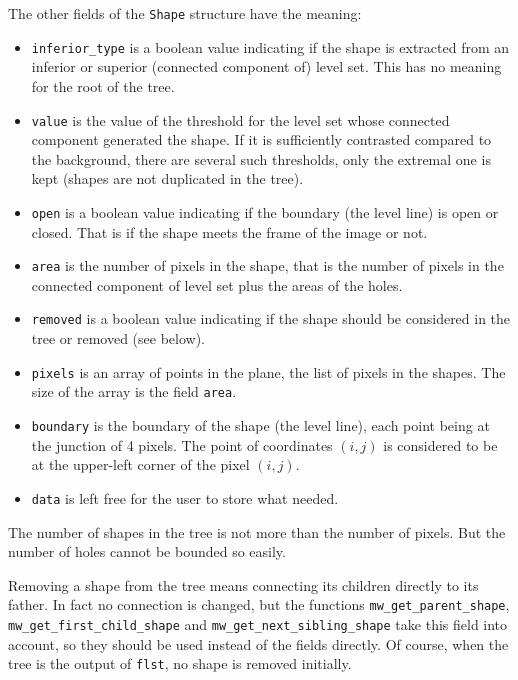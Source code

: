 The other fields of the \texttt{Shape} structure have the meaning:
\begin{itemize}
\item \texttt{inferior\_type} is a boolean value indicating if the shape is
extracted from an inferior or superior (connected component of) level
set. This has no meaning for the root of the tree.
\item \texttt{value} is the value of the threshold for the level set whose
connected component generated the shape. If it is sufficiently contrasted
compared to the background, there are several such thresholds, only the
extremal one is kept (shapes are not duplicated in the tree).
\item \texttt{open} is a boolean value indicating if the boundary (the level
line) is open or closed. That is if the shape meets the frame of the image or
not.
\item \texttt{area} is the number of pixels in the shape, that is the number
of pixels in the connected component of level set plus the areas of the holes.
\item \texttt{removed} is a boolean value indicating if the shape should be
considered in the tree or removed (see below).
\item \texttt{pixels} is an array of points in the plane, the list of pixels
in the shapes. The size of the array is the field \texttt{area}.
\item \texttt{boundary} is the boundary of the shape (the level line), each
point being at the junction of 4 pixels. The point of coordinates $(i,j)$ is
considered to be at the upper-left corner of the pixel $(i,j)$.
\item \texttt{data} is left free for the user to store what needed.
\end{itemize}

The number of shapes in the tree is not more than the number of pixels. But
the number of holes cannot be bounded so easily.

Removing a shape from the tree means connecting its children directly to its
father. In fact no connection is changed, but the functions
\texttt{mw\_get\_parent\_shape}, \texttt{mw\_get\_first\_child\_shape} and
\texttt{mw\_get\_next\_sibling\_shape} take this field into account, so they
should be used instead of the fields directly. Of course, when the tree is the
output of \texttt{flst}, no shape is removed initially.

